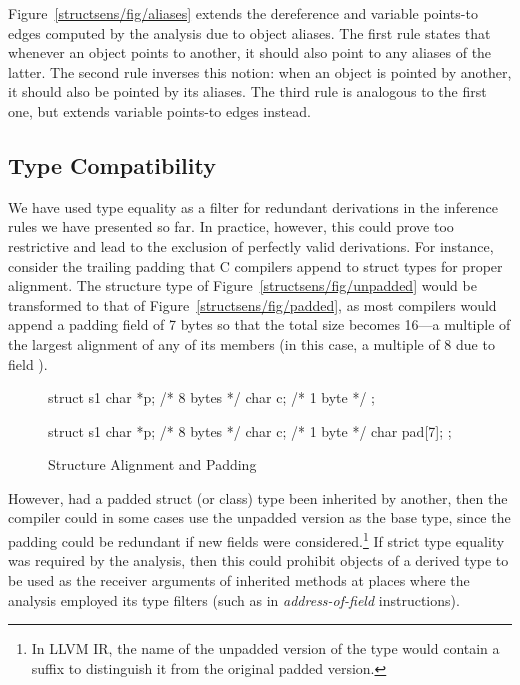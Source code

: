Figure~\ref{structsens/fig/aliases} extends the dereference and
variable points-to edges computed by the analysis due to object
aliases. The first rule states that whenever an object points to
another, it should also point to any aliases of the latter. The second
rule inverses this notion: when an object is pointed by another, it
should also be pointed by its aliases. The third rule is analogous to
the first one, but extends variable points-to edges instead.


\subsection{Type Compatibility}

We have used type equality as a filter for redundant derivations in
the inference rules we have presented so far. In practice, however,
this could prove too restrictive and lead to the exclusion of
perfectly valid derivations. For instance, consider the trailing
padding that C compilers append to struct types for proper
alignment. The structure type of Figure~\ref{structsens/fig/unpadded}
would be transformed to that of Figure~\ref{structsens/fig/padded}, as
most compilers would append a padding field of 7 bytes so that the
total size becomes 16---a multiple of the largest alignment of any of
its members (in this case, a multiple of 8 due to field ).

\begin{figure}[h!t]
  \begin{minipage}[b]{.5\linewidth}
    \centering\large
    \begin{cppcode}
      struct s1 {
        char *p;     /* 8 bytes */
        char c;      /* 1 byte */
      };
    \end{cppcode}
    \label{structsens/fig/unpadded}
  \end{minipage}%
  \begin{minipage}[b]{.5\linewidth}
    \centering\large
    \begin{cppcode}
      struct s1 {
        char *p;     /* 8 bytes */
        char c;      /* 1 byte */
        char pad[7];
      };
    \end{cppcode}
    \label{structsens/fig/padded}
  \end{minipage}
  \caption{Structure Alignment and Padding}
  \label{structsens/fig/padding}
\end{figure}

However, had a padded struct (or class) type been inherited by
another, then the compiler could in some cases use the unpadded
version as the base type, since the padding could be redundant if new
fields were considered.\footnote{In LLVM IR, the name of the unpadded
  version of the type would contain a  suffix to
  distinguish it from the original padded version.} If strict type
equality was required by the analysis, then this could prohibit
objects of a derived type to be used as the receiver arguments of
inherited methods at places where the analysis employed its type
filters (such as in \emph{address-of-field} instructions).


